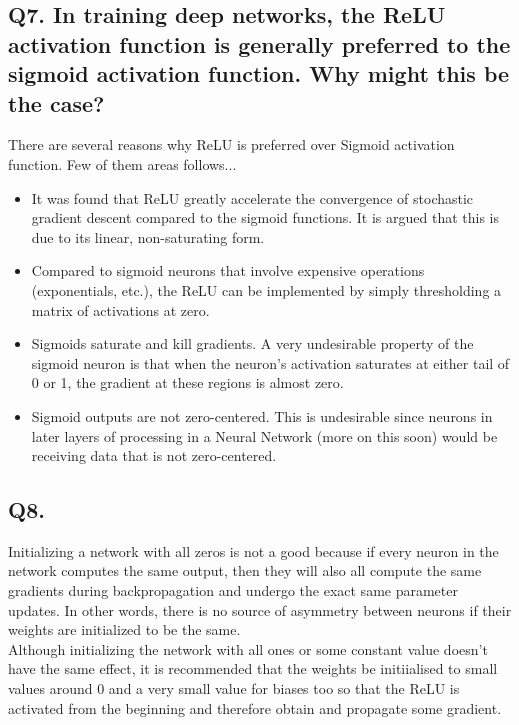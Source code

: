 \documentclass[a4paper,11pt]{article}
\begin{document}
\subsection*{Q7. In training deep networks, the ReLU activation function is generally preferred to the sigmoid activation function. Why might this be the case?}
There are several reasons why ReLU is preferred over Sigmoid activation function. Few of them areas follows...
\begin{itemize}
	\item It was found that ReLU greatly accelerate the convergence of stochastic gradient descent compared to the sigmoid functions. It is argued that this is due to its linear, non-saturating form.
	\item Compared to sigmoid neurons that involve expensive operations (exponentials, etc.), the ReLU can be implemented by simply thresholding a matrix of activations at zero.
	\item Sigmoids saturate and kill gradients. A very undesirable property of the sigmoid neuron is that when the neuron’s activation saturates at either tail of 0 or 1, the gradient at these regions is almost zero.
	\item Sigmoid outputs are not zero-centered. This is undesirable since neurons in later layers of processing in a Neural Network (more on this soon) would be receiving data that is not zero-centered.
\end{itemize}

\subsection*{Q8.}
Initializing a network with all zeros is not a good because if every neuron in the network computes the same output, then they will also all compute the same gradients during backpropagation and undergo the exact same parameter updates. In other words, there is no source of asymmetry between neurons if their weights are initialized to be the same.\\

Although initializing the network with all ones or some constant value doesn't have the same effect, it is recommended that the weights be initiialised to small values around 0 and a very small value for biases too so that the ReLU is activated from the beginning and therefore obtain and propagate some gradient.
\end{document}
